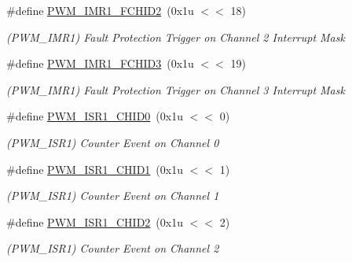 \begin{DoxyCompactItemize}
\mbox{\label{group__SAMS70__PWM_ga6186867169ba180d0a2d5577ffdc7ec9}} 
\#define \mbox{\hyperlink{group__SAMS70__PWM_ga6186867169ba180d0a2d5577ffdc7ec9}{P\+W\+M\+\_\+\+I\+M\+R1\+\_\+\+F\+C\+H\+I\+D2}}~(0x1u $<$$<$ 18)
\begin{DoxyCompactList}\small\item\em (P\+W\+M\+\_\+\+I\+M\+R1) Fault Protection Trigger on Channel 2 Interrupt Mask \end{DoxyCompactList}\item 
\mbox{\label{group__SAMS70__PWM_gac76de31d226d65cee7647b5528702f38}} 
\#define \mbox{\hyperlink{group__SAMS70__PWM_gac76de31d226d65cee7647b5528702f38}{P\+W\+M\+\_\+\+I\+M\+R1\+\_\+\+F\+C\+H\+I\+D3}}~(0x1u $<$$<$ 19)
\begin{DoxyCompactList}\small\item\em (P\+W\+M\+\_\+\+I\+M\+R1) Fault Protection Trigger on Channel 3 Interrupt Mask \end{DoxyCompactList}\item 
\mbox{\label{group__SAMS70__PWM_ga9a88a70dbfc521ccca132513e74e24df}} 
\#define \mbox{\hyperlink{group__SAMS70__PWM_ga9a88a70dbfc521ccca132513e74e24df}{P\+W\+M\+\_\+\+I\+S\+R1\+\_\+\+C\+H\+I\+D0}}~(0x1u $<$$<$ 0)
\begin{DoxyCompactList}\small\item\em (P\+W\+M\+\_\+\+I\+S\+R1) Counter Event on Channel 0 \end{DoxyCompactList}\item 
\mbox{\label{group__SAMS70__PWM_ga59c811d09679a3521831806584ba9e78}} 
\#define \mbox{\hyperlink{group__SAMS70__PWM_ga59c811d09679a3521831806584ba9e78}{P\+W\+M\+\_\+\+I\+S\+R1\+\_\+\+C\+H\+I\+D1}}~(0x1u $<$$<$ 1)
\begin{DoxyCompactList}\small\item\em (P\+W\+M\+\_\+\+I\+S\+R1) Counter Event on Channel 1 \end{DoxyCompactList}\item 
\mbox{\label{group__SAMS70__PWM_ga877d53e5a7f56b6fa1a120a152504a75}} 
\#define \mbox{\hyperlink{group__SAMS70__PWM_ga877d53e5a7f56b6fa1a120a152504a75}{P\+W\+M\+\_\+\+I\+S\+R1\+\_\+\+C\+H\+I\+D2}}~(0x1u $<$$<$ 2)
\begin{DoxyCompactList}\small\item\em (P\+W\+M\+\_\+\+I\+S\+R1) Counter Event on Channel 2 \end{DoxyCompactList}\item 
$$
\end{DoxyCompactItemize}
